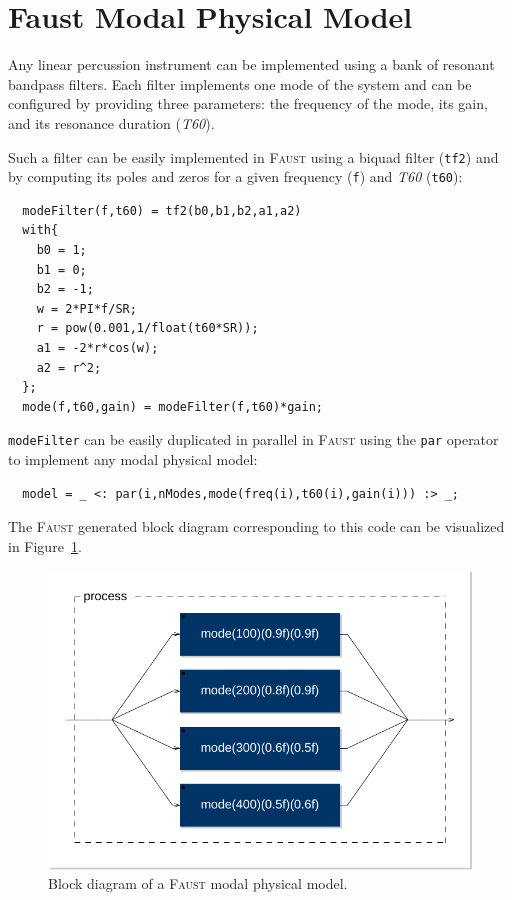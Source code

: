 \documentclass[11pt,a4paper]{article}
\newcommand{\f}{\textsc{Faust}}
\begin{document}
\section{Faust Modal Physical Model}
\label{sec:model}

Any linear percussion instrument can be implemented using a bank of resonant bandpass filters. \cite{Smith2010} Each filter implements one mode of the system and can be configured by providing three parameters: the frequency of the mode, its gain, and its resonance duration (\textit{T60}).

Such a filter can be easily implemented in \f{} using a biquad filter (\texttt{tf2}) and by computing its poles and zeros for a given frequency (\texttt{f}) and \textit{T60} (\texttt{t60}):

\begin{lstlisting}
  modeFilter(f,t60) = tf2(b0,b1,b2,a1,a2)
  with{
    b0 = 1;
	b1 = 0;
	b2 = -1;
	w = 2*PI*f/SR;
	r = pow(0.001,1/float(t60*SR));
	a1 = -2*r*cos(w);
	a2 = r^2;
  };
  mode(f,t60,gain) = modeFilter(f,t60)*gain;
\end{lstlisting}

\texttt{modeFilter} can be easily duplicated in parallel in \f{} using the \texttt{par} operator to implement any modal physical model:

\begin{lstlisting}
  model = _ <: par(i,nModes,mode(freq(i),t60(i),gain(i))) :> _;
\end{lstlisting}

The \f{} generated block diagram corresponding to this code can be visualized in Figure~\ref{fig:modalModel}.

\begin{figure}[htbp]
 	\centering \includegraphics[width=\columnwidth]{pictures/modalModel}
	\caption{Block diagram of a \f{} modal physical model.}
	\label{fig:modalModel}
\end{figure}
\end{document}
